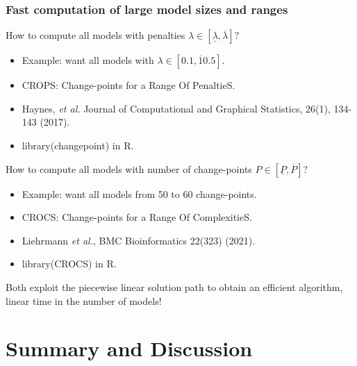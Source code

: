 \documentclass{beamer}
\begin{document}
\begin{frame}
  \frametitle{Fast computation of large model sizes and ranges}

  How to compute all models with penalties $\lambda\in[\underline \lambda, \overline \lambda]$?
  \begin{itemize}
  \item Example: want all models with $\lambda\in[0.1, \overline 10.5]$.
  \item CROPS: Change-points for a Range Of PenaltieS.
  \item Haynes, \emph{et al.} Journal of Computational and Graphical Statistics, 26(1), 134-143 (2017).
  \item library(changepoint) in R.
  \end{itemize}
  
  How to compute all models with number of change-points $P\in[\underline P, \overline P]$?
  \begin{itemize}
  \item Example: want all models from 50 to 60 change-points.
  \item CROCS: Change-points for a Range Of ComplexitieS.
  \item Liehrmann \emph{et al.}, BMC Bioinformatics 22(323) (2021).
  \item library(CROCS) in R.
  \end{itemize}
  Both exploit the piecewise linear solution path to obtain an efficient algorithm, linear time in the number of models!
\end{frame}
 
\section{Summary and Discussion}
\end{document}
